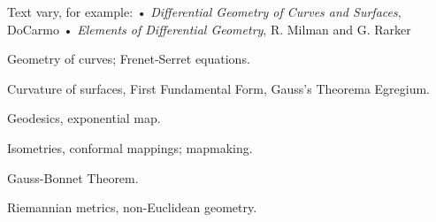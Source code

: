 \documentclass{osucourse}
\begin{document}
\CatalogDescription
\PrerequisitesAndExclusions

\begin{Text}
Text vary, for example: • \emph{Differential Geometry of Curves and Surfaces}, DoCarmo • \emph{Elements of Differential Geometry}, R. Milman and G. Rarker
\end{Text}

\begin{TopicsList}
\item Geometry of curves; Frenet-Serret equations.
\item Curvature of surfaces, First Fundamental Form, Gauss's Theorema Egregium.
\item Geodesics, exponential map.
\item Isometries, conformal mappings; mapmaking.
\item Gauss-Bonnet Theorem.
\item Riemannian metrics, non-Euclidean geometry.
\end{TopicsList}
\end{document}
